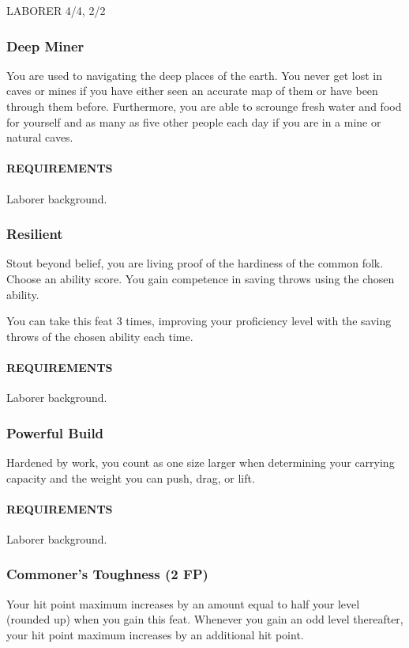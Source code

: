 LABORER 4/4, 2/2
    \subsubsection{Deep Miner} \label{feat::deepminer}
        You are used to navigating the deep places of the earth.
        You never get lost in caves or mines if you have either seen an accurate map of them or have been through them before.
        Furthermore, you are able to scrounge fresh water and food for yourself and as many as five other people each day if you are in a mine or natural caves.
        \paragraph{REQUIREMENTS} Laborer background.

    \subsubsection{Resilient} \label{feat::resilient}
        Stout beyond belief, you are living proof of the hardiness of the common folk.
        Choose an ability score.
        You gain competence in saving throws using the chosen ability.

        You can take this feat 3 times, improving your proficiency level with the saving throws of the chosen ability each time.
        \paragraph{REQUIREMENTS} Laborer background.

    \subsubsection{Powerful Build} \label{feat::powerfulbuild}
        Hardened by work, you count as one size larger when determining your carrying capacity and the weight you can push, drag, or lift.
        \paragraph{REQUIREMENTS} Laborer background.

    \subsubsection{Commoner's Toughness (2 FP)} \label{feat::commonerstoughness}
        Your hit point maximum increases by an amount equal to half your level (rounded up) when you gain this feat.
        Whenever you gain an odd level thereafter, your hit point maximum increases by an additional hit point.

